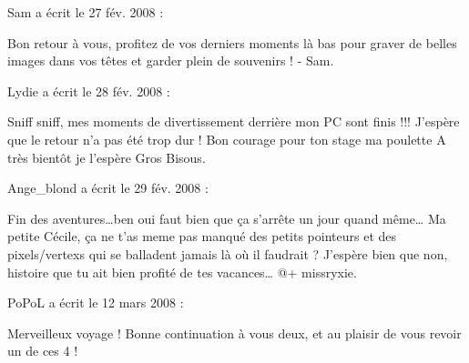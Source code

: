 \medskip
Sam a écrit le 27 fév. 2008 :
\begin{displayquote}
Bon retour à vous, profitez de vos derniers moments là bas pour graver de belles images dans vos têtes et garder plein de souvenirs !
- Sam.
\end{displayquote}

\medskip
Lydie a écrit le 28 fév. 2008 :
\begin{displayquote}
Sniff sniff, mes moments de divertissement derrière mon PC sont finis !!!
J'espère que le retour n'a pas été trop dur !
Bon courage pour ton stage ma poulette
A très bientôt je l'espère
Gros Bisous.
\end{displayquote}

\medskip
Ange\_blond a écrit le 29 fév. 2008 :
\begin{displayquote}
Fin des aventures\dots ben oui faut bien que ça s'arrête un jour quand même\dots
Ma petite Cécile, ça ne t'as meme pas manqué des petits pointeurs et des pixels/vertexs qui se balladent jamais là où il faudrait ?
J'espère bien que non, histoire que tu ait bien profité de tes vacances\dots
@+ missryxie.
\end{displayquote}

\medskip
PoPoL a écrit le 12 mars 2008 :
\begin{displayquote}
Merveilleux voyage ! Bonne continuation à vous deux, et au plaisir de vous revoir un de ces 4 !
\end{displayquote}

\vfill
